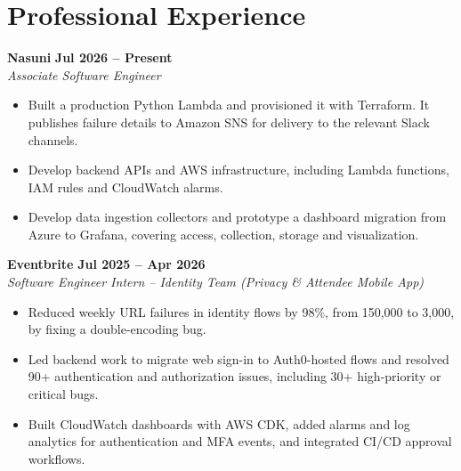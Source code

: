 \documentclass[letterpaper,10pt]{article}
\begin{document}
\section{Professional Experience}
\noindent\textbf{Nasuni} \hfill \textbf{Jul 2026 -- Present} \\
\textit{Associate Software Engineer} \\
\begin{itemize}[itemsep=0pt, topsep=2pt, parsep=0pt]
  \item Built a production Python Lambda and provisioned it with Terraform. It publishes failure details to Amazon SNS for delivery to the relevant Slack channels.
  \item Develop backend APIs and AWS infrastructure, including Lambda functions, IAM rules and CloudWatch alarms.
  \item Develop data ingestion collectors and prototype a dashboard migration from Azure to Grafana, covering access, collection, storage and visualization.
\end{itemize}

\noindent\textbf{Eventbrite} \hfill \textbf{Jul 2025 -- Apr 2026} \\
\textit{Software Engineer Intern – Identity Team (Privacy \& Attendee Mobile App)} \\
\begin{itemize}[itemsep=0pt, topsep=2pt, parsep=0pt]
  \item Reduced weekly URL failures in identity flows by 98\%, from 150,000 to 3,000, by fixing a double-encoding bug.
  \item Led backend work to migrate web sign-in to Auth0-hosted flows and resolved 90+ authentication and authorization issues, including 30+ high-priority or critical bugs.
  \item Built CloudWatch dashboards with AWS CDK, added alarms and log analytics for authentication and MFA events, and integrated CI/CD approval workflows.
\end{itemize}

\vspace{-.5em}

\end{document}
